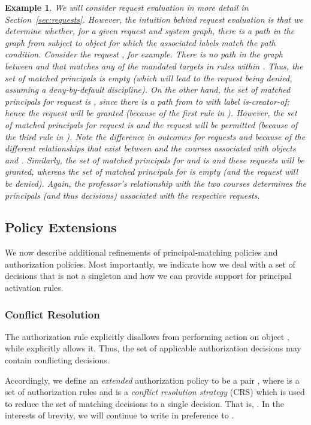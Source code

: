 \documentclass{article}
\newtheorem{example}{Example}
\begin{document}
\begin{example}
We will consider request evaluation in more detail in Section~\ref{sec:requests}.
However, the intuition behind request evaluation is that we determine whether, for a given request and system graph, there is a path in the graph from subject to object for which the associated labels match the path condition.
Consider the request , for example.
There is no path in the graph between  and  that matches any of the mandated targets in rules within .
Thus, the set of matched principals is empty (which will lead to the request being denied, assuming a deny-by-default discipline).
On the other hand, the set of matched principals for request  is , since there is a path from  to  with label \textsf{is-creator-of}; hence the request will be granted (because of the first rule in ).
However, the set of matched principals for request  is  and the request will be permitted (because of the third rule in ).
Note the difference in outcomes for requests  and  because of the different relationships that exist between  and the courses associated with objects  and .
Similarly, the set of matched principals for  and  is  and these requests will be granted, whereas the set of matched principals for  is empty (and the request will be denied).
Again, the professor's relationship with the two courses determines the  principals (and thus decisions) associated with the respective requests.
\end{example}

\subsection{Policy Extensions}\label{sec:model:policy-extensions}

We now describe additional refinements of principal-matching policies and authorization policies.
Most importantly, we indicate how we deal with a set of decisions that is not a singleton and how we can provide support for principal activation rules.

\subsubsection{Conflict Resolution}\label{sec:model:policy-extensions:conflict-resolution}
The authorization rule  explicitly disallows  from performing action  on object , while  explicitly allows it.
Thus, the set of applicable authorization decisions may contain conflicting decisions.

Accordingly, we define an \emph{extended} authorization policy to be a pair , where  is a set of authorization rules and  is a \emph{conflict resolution strategy} (CRS) which is used to reduce the set of matching decisions to a single decision.
That is, \mbox{}.
In the interests of brevity, we will continue to write  in preference to .
\end{document}
